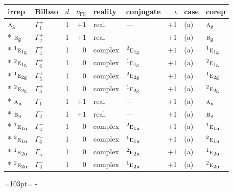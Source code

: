 \documentclass[10pt,a4paper]{article}
\newcommand{\needspace}[1]{\par\penalty-100\begingroup\dimen0=#1\relax\dimen2=\pagegoal
  \advance\dimen2-\pagetotal\ifdim\dimen0>\dimen2\relax\ifdim\dimen2>0pt\vfil\break\fi\fi
  \endgroup}
\numberwithin{equation}{section}
\newcommand{\irr}[1]{\text{\normalfont\scshape #1}}
\newcommand{\conjpair}[1]{{}^{#1}}
\newcommand{\ptag}[1]{\mathrm{#1}}
\newcommand{\fsind}{\nu_{\mathrm{FS}}}
\begin{document}
{\small\renewcommand{\arraystretch}{1.25}\setlength{\tabcolsep}{4pt}\begin{longtable}{@{}llrrllrll@{}}\toprule
irrep & Bilbao & $d$ & $\fsind$ & reality & conjugate & $\iota$ & case & corep\\\midrule\endhead
\bottomrule\endfoot\endlastfoot
$\irr{a}_{\ptag{g}}$ & $\Gamma_{1}^{+}$ & 1 & $+1$ & real & --- & $+1$ & (a) & $\irr{a}_{\ptag{g}}$\\*
$\irr{b}_{\ptag{g}}$ & $\Gamma_{2}^{+}$ & 1 & $+1$ & real & --- & $+1$ & (a) & $\irr{b}_{\ptag{g}}$\\*
$\conjpair{1}\irr{e}_{1\ptag{g}}$ & $\Gamma_{4}^{+}$ & 1 & $0$ & complex & $\conjpair{2}\irr{e}_{1\ptag{g}}$ & $+1$ & (a) & $\conjpair{1}\irr{e}_{1\ptag{g}}$\\*
$\conjpair{2}\irr{e}_{1\ptag{g}}$ & $\Gamma_{6}^{+}$ & 1 & $0$ & complex & $\conjpair{1}\irr{e}_{1\ptag{g}}$ & $+1$ & (a) & $\conjpair{2}\irr{e}_{1\ptag{g}}$\\*
$\conjpair{1}\irr{e}_{2\ptag{g}}$ & $\Gamma_{5}^{+}$ & 1 & $0$ & complex & $\conjpair{2}\irr{e}_{2\ptag{g}}$ & $+1$ & (a) & $\conjpair{1}\irr{e}_{2\ptag{g}}$\\*
$\conjpair{2}\irr{e}_{2\ptag{g}}$ & $\Gamma_{3}^{+}$ & 1 & $0$ & complex & $\conjpair{1}\irr{e}_{2\ptag{g}}$ & $+1$ & (a) & $\conjpair{2}\irr{e}_{2\ptag{g}}$\\*
$\irr{a}_{\ptag{u}}$ & $\Gamma_{1}^{-}$ & 1 & $+1$ & real & --- & $+1$ & (a) & $\irr{a}_{\ptag{u}}$\\*
$\irr{b}_{\ptag{u}}$ & $\Gamma_{2}^{-}$ & 1 & $+1$ & real & --- & $+1$ & (a) & $\irr{b}_{\ptag{u}}$\\*
$\conjpair{1}\irr{e}_{1\ptag{u}}$ & $\Gamma_{4}^{-}$ & 1 & $0$ & complex & $\conjpair{2}\irr{e}_{1\ptag{u}}$ & $+1$ & (a) & $\conjpair{1}\irr{e}_{1\ptag{u}}$\\*
$\conjpair{2}\irr{e}_{1\ptag{u}}$ & $\Gamma_{6}^{-}$ & 1 & $0$ & complex & $\conjpair{1}\irr{e}_{1\ptag{u}}$ & $+1$ & (a) & $\conjpair{2}\irr{e}_{1\ptag{u}}$\\*
$\conjpair{1}\irr{e}_{2\ptag{u}}$ & $\Gamma_{5}^{-}$ & 1 & $0$ & complex & $\conjpair{2}\irr{e}_{2\ptag{u}}$ & $+1$ & (a) & $\conjpair{1}\irr{e}_{2\ptag{u}}$\\*
$\conjpair{2}\irr{e}_{2\ptag{u}}$ & $\Gamma_{3}^{-}$ & 1 & $0$ & complex & $\conjpair{1}\irr{e}_{2\ptag{u}}$ & $+1$ & (a) & $\conjpair{2}\irr{e}_{2\ptag{u}}$\\
\bottomrule\end{longtable}}
\needspace{103pt}
\end{document}
